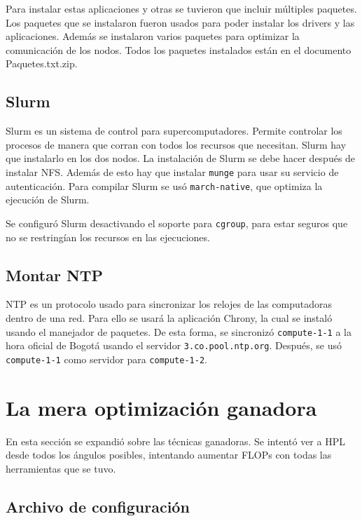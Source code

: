 \documentclass[conference,compsoc]{IEEEtran}
\begin{document}
Para instalar estas aplicaciones y otras se tuvieron que incluir múltiples paquetes. Los paquetes que se instalaron fueron usados para poder instalar los drivers y las aplicaciones. Además se instalaron varios paquetes para optimizar la comunicación de los nodos. Todos los paquetes instalados están en el documento Paquetes.txt.zip.
\subsection{Slurm}
Slurm es un sistema de control para supercomputadores. Permite controlar los procesos de manera que corran con todos los recursos que necesitan. Slurm hay que instalarlo en los dos nodos. La instalación de Slurm se debe hacer después de instalar NFS. Además de esto hay que instalar \verb|munge| para usar su servicio de autenticación. Para compilar Slurm se usó \verb|march-native|, que optimiza la ejecución de Slurm.

Se configuró Slurm desactivando el soporte para \verb|cgroup|, para estar seguros que no se restringían los recursos en las ejecuciones.

\subsection{Montar NTP}
NTP es un protocolo usado para sincronizar los relojes de las computadoras dentro de una red. Para ello se usará la aplicación Chrony, la cual se instaló usando el manejador de paquetes. De esta forma, se sincronizó \verb|compute-1-1| a la hora oficial de Bogotá usando el servidor \verb|3.co.pool.ntp.org|. Después, se usó \verb|compute-1-1| como servidor para \verb|compute-1-2|.

\section{La mera optimización ganadora}
En esta sección se expandió sobre las técnicas ganadoras. Se intentó ver a HPL desde todos los ángulos posibles, intentando aumentar FLOPs con todas las herramientas que se tuvo.

\subsection{Archivo de configuración}
\end{document}
